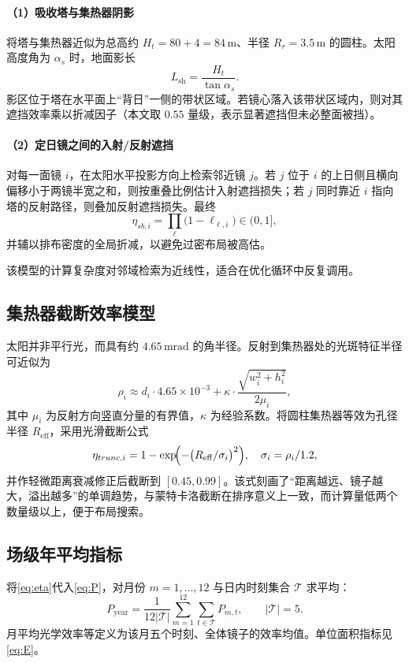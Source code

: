 \documentclass[withoutpreface,bwprint]{cumcmthesis}
\begin{document}
\paragraph{（1）吸收塔与集热器阴影}
将塔与集热器近似为总高约 $H_t=80+4=84\,\mathrm{m}$、半径 $R_r=3.5\,\mathrm{m}$ 的圆柱。太阳高度角为 $\alpha_s$ 时，地面影长
\begin{equation}
L_{\mathrm{sh}}=\frac{H_t}{\tan\alpha_s}.
\end{equation}
影区位于塔在水平面上“背日”一侧的带状区域。若镜心落入该带状区域内，则对其遮挡效率乘以折减因子（本文取 $0.55$ 量级，表示显著遮挡但未必整面被挡）。

\paragraph{（2）定日镜之间的入射/反射遮挡}
对每一面镜 $i$，在太阳水平投影方向上检索邻近镜 $j$。若 $j$ 位于 $i$ 的上日侧且横向偏移小于两镜半宽之和，则按重叠比例估计入射遮挡损失；若 $j$ 同时靠近 $i$ 指向塔的反射路径，则叠加反射遮挡损失。最终
\begin{equation}
\eta_{sb,i}=\prod_{\ell}\bigl(1-\ell_{\ell,i}\bigr)\in(0,1],
\end{equation}
并辅以排布密度的全局折减，以避免过密布局被高估。

该模型的计算复杂度对邻域检索为近线性，适合在优化循环中反复调用。

\subsection{集热器截断效率模型}
太阳并非平行光，而具有约 $4.65\,\mathrm{mrad}$ 的角半径。反射到集热器处的光斑特征半径可近似为
\begin{equation}
\rho_i \approx d_i\cdot 4.65\times10^{-3}+\kappa\cdot\frac{\sqrt{w_i^2+h_i^2}}{2\mu_i},
\label{eq:spot}
\end{equation}
其中 $\mu_i$ 为反射方向竖直分量的有界值，$\kappa$ 为经验系数。将圆柱集热器等效为孔径半径 $R_{\mathrm{eff}}$，采用光滑截断公式
\begin{equation}
\eta_{trunc,i}=1-\exp\!\Bigl(-\bigl(R_{\mathrm{eff}}/\sigma_i\bigr)^2\Bigr),\quad
\sigma_i=\rho_i/1.2,
\label{eq:trunc}
\end{equation}
并作轻微距离衰减修正后截断到 $[0.45,0.99]$。该式刻画了“距离越远、镜子越大，溢出越多”的单调趋势，与蒙特卡洛截断在排序意义上一致，而计算量低两个数量级以上，便于布局搜索。

\subsection{场级年平均指标}
将\eqref{eq:eta}代入\eqref{eq:P}，对月份 $m=1,\ldots,12$ 与日内时刻集合 $\mathcal{T}$ 求平均：
\begin{equation}
P_{\mathrm{year}}=\frac{1}{12|\mathcal{T}|}
\sum_{m=1}^{12}\sum_{t\in\mathcal{T}}P_{m,t},\qquad
|\mathcal{T}|=5.
\label{eq:Pyear}
\end{equation}
月平均光学效率等定义为该月五个时刻、全体镜子的效率均值。单位面积指标见\eqref{eq:E}。
\end{document}
